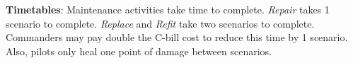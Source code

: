 \item {\bfseries Timetables}: Maintenance activities take time to complete.
\emph{Repair} takes 1 scenario to complete.
\emph{Replace} and \emph{Refit} take two scenarios to complete.
Commanders may pay double the C-bill cost to reduce this time by 1 scenario.
Also, pilots only heal one point of damage between scenarios.
